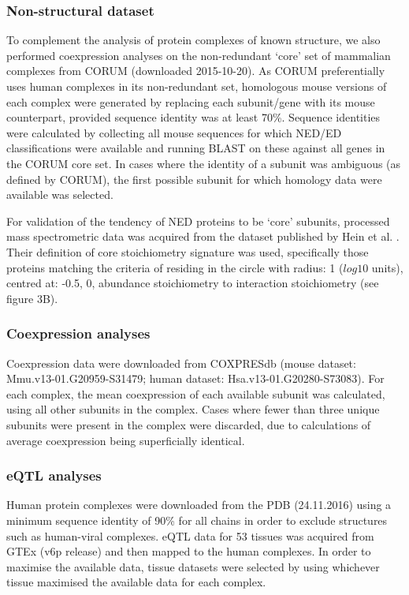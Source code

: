 \documentclass[a4paper,11pt,twoside,openright]{scrbook}
\begin{document}
\subsubsection{Non-structural dataset}
To complement the analysis of protein complexes of known structure, we also performed coexpression analyses on the non-redundant `core' set of mammalian complexes from CORUM \cite{Ruepp2009} (downloaded 2015-10-20). As CORUM preferentially uses human complexes in its non-redundant set, homologous mouse versions of each complex were generated by replacing each subunit/gene with its mouse counterpart, provided sequence identity was at least 70\%. Sequence identities were calculated by collecting all mouse sequences for which NED/ED classifications were available and running BLAST on these against all genes in the CORUM core set. In cases where the identity of a subunit was ambiguous (as defined by CORUM), the first possible subunit for which homology data were available was selected.

For validation of the tendency of NED proteins to be `core' subunits, processed mass spectrometric data was acquired from the dataset published by Hein et al. \cite{Hein2015}. Their definition of core stoichiometry signature was used, specifically those proteins matching the criteria of residing in the circle with radius: 1 ($log{10}$ units), centred at: -0.5, 0, abundance stoichiometry to interaction stoichiometry (see figure 3B\cite{Hein2015}).

\subsubsection{Coexpression analyses}
Coexpression data were downloaded from COXPRESdb \cite{Okamura2014} (mouse dataset: Mmu.v13-01.G20959-S31479; human dataset: Hsa.v13-01.G20280-S73083). For each complex, the mean coexpression of each available subunit was calculated, using all other subunits in the complex. Cases where fewer than three unique subunits were present in the complex were discarded, due to calculations of average coexpression being superficially identical.

\subsubsection{eQTL analyses}
Human protein complexes were downloaded from the PDB (24.11.2016) using a minimum sequence identity of 90\% for all chains in order to exclude structures such as human-viral complexes. eQTL data for 53 tissues was acquired from GTEx (v6p release) and then mapped to the human complexes. In order to maximise the available data, tissue datasets were selected by using whichever tissue maximised the available data for each complex.
\end{document}
